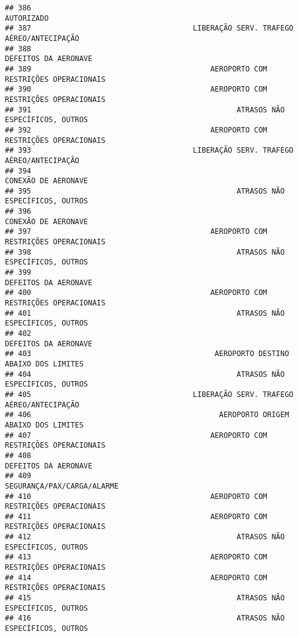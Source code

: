 \documentclass[
]{article}
\begin{document}
\begin{verbatim}
## 386                                                                    AUTORIZADO
## 387                                     LIBERAÇÃO SERV. TRAFEGO AÉREO/ANTECIPAÇÃO
## 388                                                          DEFEITOS DA AERONAVE
## 389                                         AEROPORTO COM RESTRIÇÕES OPERACIONAIS
## 390                                         AEROPORTO COM RESTRIÇÕES OPERACIONAIS
## 391                                               ATRASOS NÃO ESPECÍFICOS, OUTROS
## 392                                         AEROPORTO COM RESTRIÇÕES OPERACIONAIS
## 393                                     LIBERAÇÃO SERV. TRAFEGO AÉREO/ANTECIPAÇÃO
## 394                                                           CONEXÃO DE AERONAVE
## 395                                               ATRASOS NÃO ESPECÍFICOS, OUTROS
## 396                                                           CONEXÃO DE AERONAVE
## 397                                         AEROPORTO COM RESTRIÇÕES OPERACIONAIS
## 398                                               ATRASOS NÃO ESPECÍFICOS, OUTROS
## 399                                                          DEFEITOS DA AERONAVE
## 400                                         AEROPORTO COM RESTRIÇÕES OPERACIONAIS
## 401                                               ATRASOS NÃO ESPECÍFICOS, OUTROS
## 402                                                          DEFEITOS DA AERONAVE
## 403                                          AEROPORTO DESTINO ABAIXO DOS LIMITES
## 404                                               ATRASOS NÃO ESPECÍFICOS, OUTROS
## 405                                     LIBERAÇÃO SERV. TRAFEGO AÉREO/ANTECIPAÇÃO
## 406                                           AEROPORTO ORIGEM ABAIXO DOS LIMITES
## 407                                         AEROPORTO COM RESTRIÇÕES OPERACIONAIS
## 408                                                          DEFEITOS DA AERONAVE
## 409                                                    SEGURANÇA/PAX/CARGA/ALARME
## 410                                         AEROPORTO COM RESTRIÇÕES OPERACIONAIS
## 411                                         AEROPORTO COM RESTRIÇÕES OPERACIONAIS
## 412                                               ATRASOS NÃO ESPECÍFICOS, OUTROS
## 413                                         AEROPORTO COM RESTRIÇÕES OPERACIONAIS
## 414                                         AEROPORTO COM RESTRIÇÕES OPERACIONAIS
## 415                                               ATRASOS NÃO ESPECÍFICOS, OUTROS
## 416                                               ATRASOS NÃO ESPECÍFICOS, OUTROS

\end{verbatim}
\end{document}
